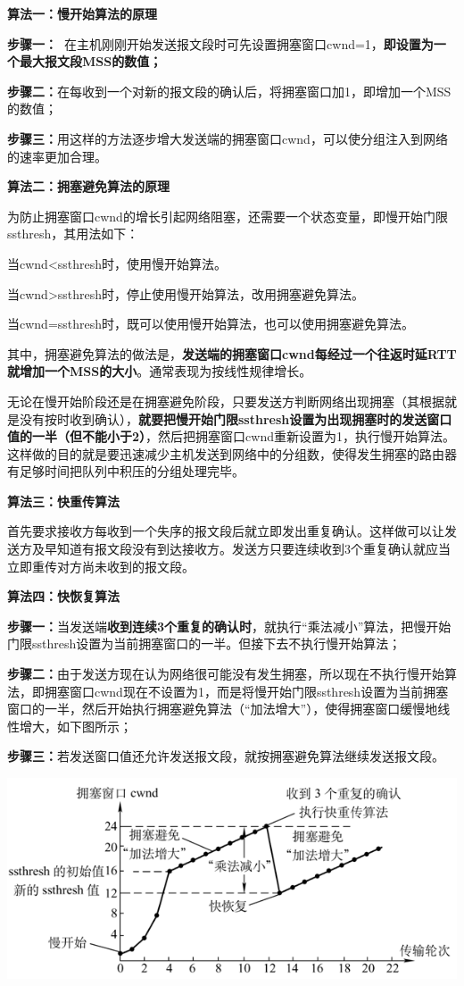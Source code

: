 \textbf{{算法一：慢开始算法的原理}}

\textbf{{步骤一：~}}在主机刚刚开始发送报文段时可先设置拥塞窗口cwnd=1，\textbf{即设置为一个最大报文段MSS的数值；}

\textbf{{步骤二：}}在每收到一个对新的报文段的确认后，将拥塞窗口加1，即增加一个MSS的数值；

\textbf{{步骤三：}}用这样的方法逐步增大发送端的拥塞窗口cwnd，可以使分组注入到网络的速率更加合理。

\textbf{{\textbf{{算法二：}}{拥塞避免算法的原理}}}

为防止拥塞窗口cwnd的增长引起网络阻塞，还需要一个状态变量，即慢开始门限ssthresh，其用法如下：

当cwnd\textless{}ssthresh时，使用慢开始算法。

当cwnd\textgreater{}ssthresh时，停止使用慢开始算法，改用拥塞避免算法。

当cwnd=ssthresh时，既可以使用慢开始算法，也可以使用拥塞避免算法。

其中，拥塞避免算法的做法是，\textbf{发送端的拥塞窗口cwnd每经过一个往返时延RTT就增加一个MSS的大小}。通常表现为按线性规律增长。

无论在慢开始阶段还是在拥塞避免阶段，只要发送方判断网络出现拥塞（其根据就是没有按时收到确认），{\textbf{就要把慢开始门限ssthresh设置为出现拥塞时的发送窗口值的一半（但不能小于2）}}，然后把拥塞窗口cwnd重新设置为1，执行慢开始算法。这样做的目的就是要迅速减少主机发送到网络中的分组数，使得发生拥塞的路由器有足够时间把队列中积压的分组处理完毕。

\textbf{{\textbf{{算法三：}}{快重传算法}}}

首先要求接收方每收到一个失序的报文段后就立即发出重复确认。这样做可以让发送方及早知道有报文段没有到达接收方。发送方只要连续收到3个重复确认就应当立即重传对方尚未收到的报文段。

\textbf{{\textbf{{算法四：}}{快恢复算法}}}

\textbf{{步骤一：}}当发送端{\textbf{收到连续3个重复的确认时}}，就执行``乘法减小''算法，把慢开始门限ssthresh设置为当前拥塞窗口的一半。但接下去不执行慢开始算法；

\textbf{{步骤二：}}由于发送方现在认为网络很可能没有发生拥塞，所以现在不执行慢开始算法，即拥塞窗口cwnd现在不设置为1，而是将慢开始门限ssthresh设置为当前拥塞窗口的一半，然后开始执行拥塞避免算法（``加法增大''），使得拥塞窗口缓慢地线性增大，如下图所示；

\textbf{{步骤三：}}若发送窗口值还允许发送报文段，就按拥塞避免算法继续发送报文段。

\includegraphics[width=6in]{png-jpeg-pics/80404D4E0CFC98A93C39369F240C45EE.png}
